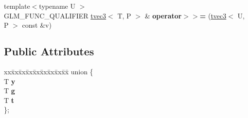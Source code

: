 \begin{DoxyCompactItemize}
\item 
\hypertarget{structglm_1_1tvec3_adfdb21940170dce288bebfff52613ebc}{{\footnotesize template$<$typename U $>$ }\\G\-L\-M\-\_\-\-F\-U\-N\-C\-\_\-\-Q\-U\-A\-L\-I\-F\-I\-E\-R \hyperlink{structglm_1_1tvec3}{tvec3}$<$ T, P $>$ \& {\bfseries operator$>$$>$=} (\hyperlink{structglm_1_1tvec3}{tvec3}$<$ U, P $>$ const \&v)}\label{structglm_1_1tvec3_adfdb21940170dce288bebfff52613ebc}

\end{DoxyCompactItemize}
\subsection*{Public Attributes}
\begin{DoxyCompactItemize}
\item 
\hypertarget{structglm_1_1tvec3_a78e5ba0f29b48952c41c492411b6a6b6}{\begin{tabbing}
xx\=xx\=xx\=xx\=xx\=xx\=xx\=xx\=xx\=\kill
union \{\\
\hypertarget{unionglm_1_1tvec3_1_1@6_a84f2c27604bd6ab7f256e3912fb8a79d}{\>T {\bfseries x}\\
\hypertarget{unionglm_1_1tvec3_1_1@6_ac558022923dfc3f952f5946532c1f4b0}{\>T {\bfseries r}\\
\hypertarget{unionglm_1_1tvec3_1_1@6_ac350e1f6f735cfd76cd2d44c779ebca2}{\>T {\bfseries s}\\
\}; }\label{structglm_1_1tvec3_a78e5ba0f29b48952c41c492411b6a6b6}
\\

\end{tabbing}\item 
\hypertarget{structglm_1_1tvec3_a5812cad033493763e2a520718b4073ab}{\begin{tabbing}
xx\=xx\=xx\=xx\=xx\=xx\=xx\=xx\=xx\=\kill
union \{\\
\hypertarget{unionglm_1_1tvec3_1_1@8_a3969b512749f01b1afd7d60f32f50c94}{\>T {\bfseries y}\\
\hypertarget{unionglm_1_1tvec3_1_1@8_a1ed9dc6682a6d36221feb544337e60e3}{\>T {\bfseries g}\\
\hypertarget{unionglm_1_1tvec3_1_1@8_a0a83cdfc088a60414654fd56b9b70762}{\>T {\bfseries t}\\
\}; }\label{structglm_1_1tvec3_a5812cad033493763e2a520718b4073ab}
\\

}}
\end{tabbing}}}
\end{DoxyCompactItemize}

